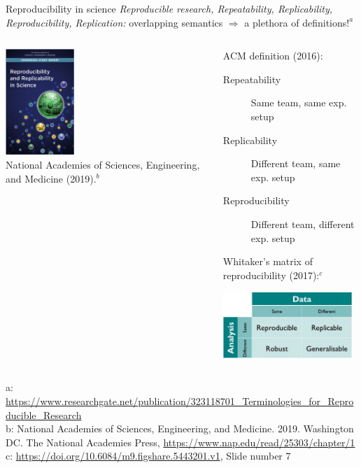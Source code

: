 \begin{frame}{Reproducibility in science}
\textit{Reproducible research, Repeatability, Replicability, Reproducibility, Replication:} overlapping semantics $\Rightarrow$ a plethora of definitions$!^{a}$\\
\begin{columns}
    \begin{column}{3.5cm}
      \begin{center}
      \includegraphics[height=4cm]{01_introduction/images/FAIR_reproducibilityUSA.png}\\
      National Academies of Sciences, Engineering, and Medicine (2019)$.^{b}$
      \end{center}
    \end{column}
    \begin{column}{8.5cm}
      ACM definition (2016):
      \begin{description}
          \item [Repeatability] Same team, same exp. setup
          \item [Replicability] Different team, same exp. setup
          \item [Reproducibility] Different team, different exp. setup
      \end{description}
      \vfill
      Whitaker's matrix of reproducibility (2017)$:^{c}$
      \begin{center}
         \includegraphics[height=2.5cm]{01_introduction/images/FAIR_Whitaker_matrix_RRRG.png}\\
      \end{center}
    \end{column}
\end{columns}
\tiny{a: \url{https://www.researchgate.net/publication/323118701_Terminologies_for_Reproducible_Research}\\
      b: National Academies of Sciences, Engineering, and Medicine. 2019. Washington DC. The National Academies Press, \url{https://www.nap.edu/read/25303/chapter/1}\\
      c: \url{https://doi.org/10.6084/m9.figshare.5443201.v1}, Slide number 7}
\end{frame}
